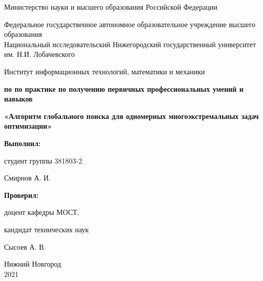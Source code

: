 \documentclass{report}
\begin{document}
\begin{large}
\begin{titlepage}

\begin{center}
Министерство науки и высшего образования Российской Федерации
\end{center}


\begin{center}
Федеральное государственное автономное образовательное учреждение высшего образования \\
Национальный исследовательский Нижегородский государственный университет им. Н.И. Лобачевского
\end{center}

\begin{center}
Институт информационных технологий, математики и механики
\end{center}

\vspace{4em}

\begin{LARGE}
    \begin{center}
        \textbf{ по по практике по получению первичных профессиональных умений и навыков} \\
    \end{center}
    \begin{center}
        \textbf{\Large«Алгоритм глобального поиска для одномерных многоэкстремальных задач оптимизации»} \\
    \end{center}
\end{LARGE}

\vspace{4em}

\newbox{\lbox}
\newlength{\maxl}
\setlength{\maxl}{\wd\lbox}
\hfill\parbox{7cm}{
\hspace*{5cm}\hspace*{-5cm}\textbf{Выполнил:} \par студент группы 381803-2 \par Смирнов А. И.\par
\par
\hspace*{5cm}\hspace*{-5cm}\textbf{Проверил:}\par доцент кафедры МОСТ, \par кандидат технических наук \par Сысоев А. В.\par
}

\vspace{\fill}

\begin{center} Нижний Новгород \\ 2021 \end{center}

\end{titlepage}
\end{large}
\end{document}
